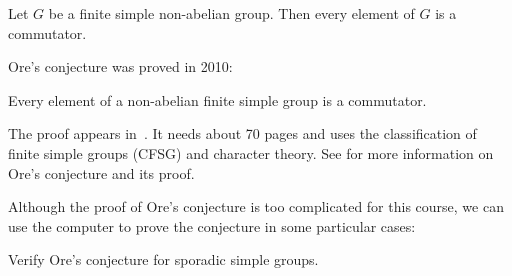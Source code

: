 \begin{conjecture}[Ore]
\label{conjecture:Ore}
    Let $G$ be a finite simple non-abelian group. 
    Then every element of $G$ is a commutator. 
\end{conjecture}

Ore's conjecture was proved in 2010:

\begin{theorem}
    Every element of a non-abelian finite simple group is a commutator.     
\end{theorem}

The proof appears in~\cite{MR2654085}. It needs about 70 pages and
uses the classification of finite simple groups (CFSG) and character theory.
See \cite{zbMATH06690771} for more information on Ore's conjecture and its proof. 

Although the proof of Ore's conjecture is too complicated for 
this course, we can use the computer to 
prove the conjecture in some particular cases:

\begin{bonus}
    Verify Ore's conjecture  
    for sporadic simple groups.    
\end{bonus}








